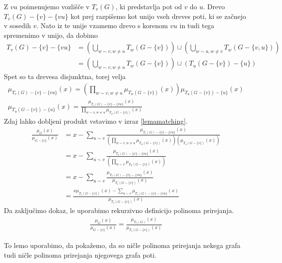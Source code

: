 \begin{dokaz}
    Z \(vu\) poimenujemo vozlišče v \(T_v(G)\), ki predstavlja pot od \(v\) do \(u\). Drevo \(T_v(G) - \{v\} - \{vu\}\) kot prej razpišemo kot unijo vseh dreves poti, ki se začnejo v sosedih \(v\). Nato iz te unije vzamemo drevo s korenom \(vu\) in tudi tega spremenimo v unijo, da dobimo
    \begin{align*}
        T_v(G) - \{v\} - \{vu\} & = \left(\bigcup_{w\sim v, w\neq u} T_w(G-\{v\})\right) \cup \left(\bigcup_{w\sim u, w\neq v} T_w(G-\{v,u\})\right) \\
                                & = \left(\bigcup_{w\sim v, w\neq u} T_w(G-\{v\})\right) \cup (T_u(G-\{v\}) - \{u\})
    \end{align*}
    Spet so ta drevesa disjunktna, torej velja
    \begin{align*}
        \mu_{T_v(G) - \{v\} - \{vu\}}(x) = \left(\prod_{w\sim v, w\neq u} \mu_{T_w(G-\{v\})}(x)\right) \mu_{T_u(G-\{v\}) - \{u\}}(x) \\
        \mu_{T_u(G-\{v\}) - \{u\}}(x) = \frac{\mu_{T_v(G) - \{v\} - \{vu\}}(x)}{\prod_{w\sim v, w\neq u} \mu_{T_w(G-\{v\})}(x)}
    \end{align*}
    Zdaj lahko dobljeni produkt vstavimo v izraz \ref{lemamatching}.
    \begin{align*}
        \frac{\mu_G(x)}{\mu_{G-\{v\}}(x)} & =x - \sum_{u\sim v}\frac{\mu_{T_v(G) - \{v\} - \{vu\}}(x)}{(\prod_{w\sim v, w\neq u} \mu_{T_w(G-\{v\})}(x))(\mu_{T_u(G-\{v\})}(x))} \\
                                          & = x - \sum_{u\sim v}\frac{\mu_{T_v(G) - \{v\} - \{vu\}}(x)}{(\prod_{w\sim v} \mu_{T_w(G-\{v\})}(x))}                                \\
                                          & = x - \sum_{u\sim v}\frac{\mu_{T_v(G) - \{v\} - \{vu\}}(x)}{\mu_{T_v(G-\{v\})}(x)}                                                  \\
                                          & = \frac{x \mu_{T_v(G-\{v\})}(x) - \sum_{u\sim v} \mu_{T_v(G) - \{v\} - \{vu\}}(x)}{\mu_{T_v(G-\{v\})}(x)}
    \end{align*}
    Da zaključimo dokaz, le uporabimo rekurzivno definicijo polinoma prirejanja.
    \begin{align*}
        \frac{\mu_G(x)}{\mu_{G-\{v\}}(x)} = \frac{\mu_{T_v(G)}(x)}{\mu_{T_v(G-\{v\})}(x)}
    \end{align*}
\end{dokaz}

To lemo uporabimo, da pokažemo, da so ničle polinoma prirejanja nekega grafa tudi ničle polinoma prirejanja njegovega grafa poti.

